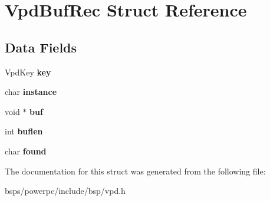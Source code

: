 \hypertarget{structVpdBufRec}{}\section{Vpd\+Buf\+Rec Struct Reference}
\label{structVpdBufRec}
\subsection*{Data Fields}
\begin{DoxyCompactItemize}
\item 
\mbox{\label{structVpdBufRec_a193ff84de75035bf2a6072b66128330c}} 
Vpd\+Key {\bfseries key}
\item 
\mbox{\label{structVpdBufRec_a9b3e95f2e40a53879bb6b893db297064}} 
char {\bfseries instance}
\item 
\mbox{\label{structVpdBufRec_a5e8db0cdcea2386cf0cf5243ca17a126}} 
void $\ast$ {\bfseries buf}
\item 
\mbox{\label{structVpdBufRec_a6b5b8c5f474afbbc7c600cbb5904ed3a}} 
int {\bfseries buflen}
\item 
\mbox{\label{structVpdBufRec_a3b04fcf5ce33a627fe21b4ed010fbe49}} 
char {\bfseries found}
\end{DoxyCompactItemize}


The documentation for this struct was generated from the following file\+:\begin{DoxyCompactItemize}
\item 
bsps/powerpc/include/bsp/vpd.\+h\end{DoxyCompactItemize}
